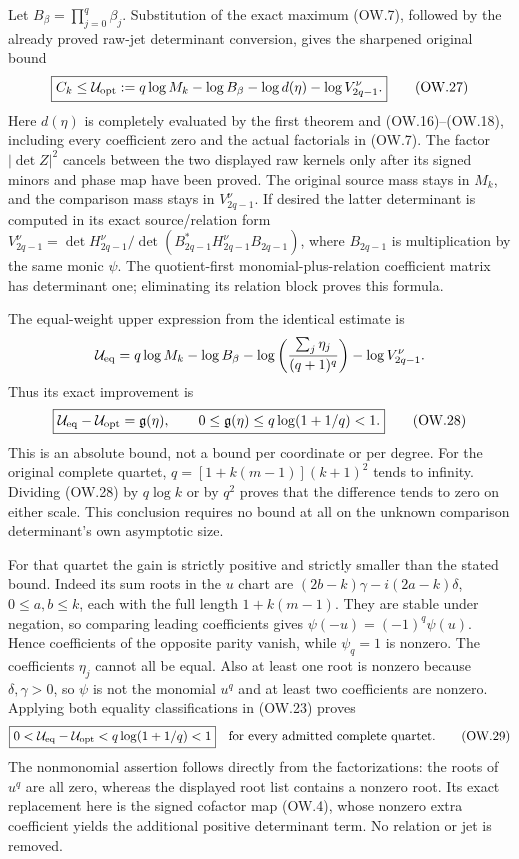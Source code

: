 Let $B_\beta=\prod_{j=0}^q\beta_j$. Substitution of the exact
maximum (OW.7), followed by the already proved raw-jet determinant
conversion, gives the sharpened original bound
\[
 \boxed{C_k\le\mathcal U_{\rm opt}:=
 q\log M_k-\log B_\beta-\log d(\eta)-\log V_{2q-1}^\nu.}
 \tag{OW.27}
\]
Here $d(\eta)$ is completely evaluated by the first theorem and
(OW.16)--(OW.18), including every coefficient zero and the actual
factorials in (OW.7). The factor $|\det Z|^2$ cancels between
the two displayed raw kernels only after its signed minors and
phase map have been proved. The original source mass stays in
$M_k$, and the comparison mass stays in $V_{2q-1}^\nu$.
If desired the latter determinant is computed in its exact
source/relation form
$V_{2q-1}^\nu=\det H_{2q-1}^\nu/
\det(B_{2q-1}^*H_{2q-1}^\nu B_{2q-1})$, where
$B_{2q-1}$ is multiplication by the same monic $\psi$.
The quotient-first monomial-plus-relation coefficient matrix has
determinant one; eliminating its relation block proves this formula.

The equal-weight upper expression from the identical estimate is
\[
 \mathcal U_{\rm eq}=
 q\log M_k-\log B_\beta-\log\left(\frac{\sum_j\eta_j}{(q+1)^q}\right)
                     -\log V_{2q-1}^\nu.
\]
Thus its exact improvement is
\[
 \boxed{\mathcal U_{\rm eq}-\mathcal U_{\rm opt}
      =\mathfrak g(\eta),\qquad
       0\le\mathfrak g(\eta)\le q\log(1+1/q)<1.}        \tag{OW.28}
\]
This is an absolute bound, not a bound per coordinate or per degree.
For the original complete quartet,
$q=[1+k(m-1)](k+1)^2$ tends to infinity. Dividing (OW.28) by
$q\log k$ or by $q^2$ proves that the difference tends to zero
on either scale. This conclusion requires no bound at all on the
unknown comparison determinant's own asymptotic size.

For that quartet the gain is strictly positive and strictly smaller
than the stated bound. Indeed its sum roots in the $u$ chart are
$(2b-k)\gamma-i(2a-k)\delta$, $0\le a,b\le k$, each with
the full length $1+k(m-1)$. They are stable under negation, so
comparing leading coefficients gives
$\psi(-u)=(-1)^q\psi(u)$. Hence coefficients of the opposite
parity vanish, while $\psi_q=1$ is nonzero. The coefficients
$\eta_j$ cannot all be equal. Also at least one root is nonzero
because $\delta,\gamma>0$, so $\psi$ is not the monomial $u^q$
and at least two coefficients are nonzero. Applying both equality
classifications in (OW.23) proves
\[
 \boxed{0<\mathcal U_{\rm eq}-\mathcal U_{\rm opt}
          <q\log(1+1/q)<1}
 \quad\text{for every admitted complete quartet.}         \tag{OW.29}
\]
The nonmonomial assertion follows directly from the factorizations:
the roots of $u^q$ are all zero, whereas the displayed root list
contains a nonzero root. Its exact replacement here is the signed
cofactor map (OW.4), whose nonzero extra coefficient yields the
additional positive determinant term. No relation or jet is removed.


